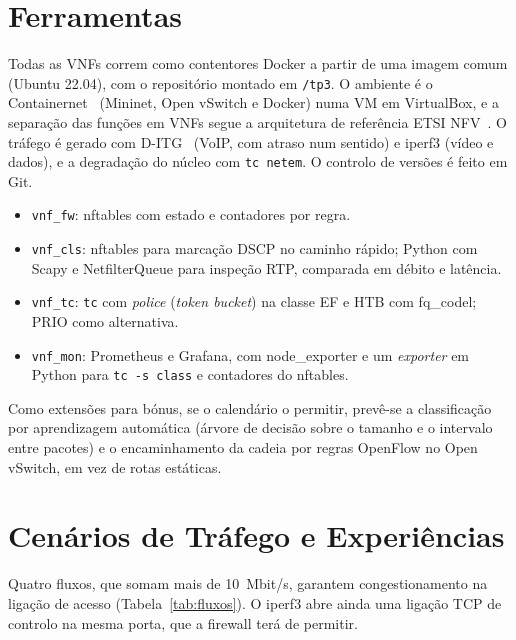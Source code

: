 \documentclass[11pt, a4paper]{article}
\begin{document}
\section{Ferramentas}
Todas as VNFs correm como contentores Docker a partir de uma imagem comum (Ubuntu 22.04), com o repositório montado em \texttt{/tp3}. O ambiente é o Containernet~\cite{medicine} (Mininet, Open vSwitch e Docker) numa VM em VirtualBox, e a separação das funções em VNFs segue a arquitetura de referência ETSI NFV~\cite{etsi002}. O tráfego é gerado com D-ITG~\cite{ditg} (VoIP, com atraso num sentido) e iperf3 (vídeo e dados), e a degradação do núcleo com \texttt{tc netem}. O controlo de versões é feito em Git.

\begin{itemize}[nosep]
    \item \texttt{vnf\_fw}: nftables com estado e contadores por regra.
    \item \texttt{vnf\_cls}: nftables para marcação DSCP no caminho rápido; Python com Scapy e NetfilterQueue para inspeção RTP, comparada em débito e latência.
    \item \texttt{vnf\_tc}: \texttt{tc} com \textit{police} (\textit{token bucket}) na classe EF e HTB com fq\_codel; PRIO como alternativa.
    \item \texttt{vnf\_mon}: Prometheus e Grafana, com node\_exporter e um \textit{exporter} em Python para \texttt{tc -s class} e contadores do nftables.
\end{itemize}

Como extensões para bónus, se o calendário o permitir, prevê-se a classificação por aprendizagem automática (árvore de decisão sobre o tamanho e o intervalo entre pacotes) e o encaminhamento da cadeia por regras OpenFlow no Open vSwitch, em vez de rotas estáticas.

\section{Cenários de Tráfego e Experiências}
Quatro fluxos, que somam mais de 10~Mbit/s, garantem congestionamento na ligação de acesso (Tabela~\ref{tab:fluxos}). O iperf3 abre ainda uma ligação TCP de controlo na mesma porta, que a firewall terá de permitir.
\end{document}
